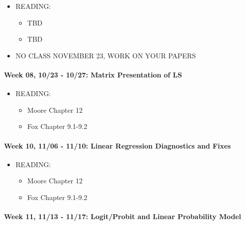 \documentclass[11pt,]{article}
\providecommand{\tightlist}{%
  \setlength{\itemsep}{0pt}\setlength{\parskip}{0pt}}
\begin{document}
\begin{itemize}
\tightlist
\item
  READING:

  \begin{itemize}
  \tightlist
  \item
    TBD
  \item
    TBD
  \end{itemize}
\item
  NO CLASS NOVEMBER 23, WORK ON YOUR PAPERS
\end{itemize}

\paragraph{Week 08, 10/23 - 10/27: Matrix Presentation of
LS}\label{week-08-1023---1027-matrix-presentation-of-ls}

\begin{itemize}
\tightlist
\item
  READING:

  \begin{itemize}
  \tightlist
  \item
    Moore Chapter 12
  \item
    Fox Chapter 9.1-9.2
  \end{itemize}
\end{itemize}

\paragraph{Week 10, 11/06 - 11/10: Linear Regression Diagnostics and
Fixes}\label{week-10-1106---1110-linear-regression-diagnostics-and-fixes}

\begin{itemize}
\tightlist
\item
  READING:

  \begin{itemize}
  \tightlist
  \item
    Moore Chapter 12
  \item
    Fox Chapter 9.1-9.2
  \end{itemize}
\end{itemize}

\paragraph{Week 11, 11/13 - 11/17: Logit/Probit and Linear Probability
Model}\label{week-11-1113---1117-logitprobit-and-linear-probability-model}
\end{document}
